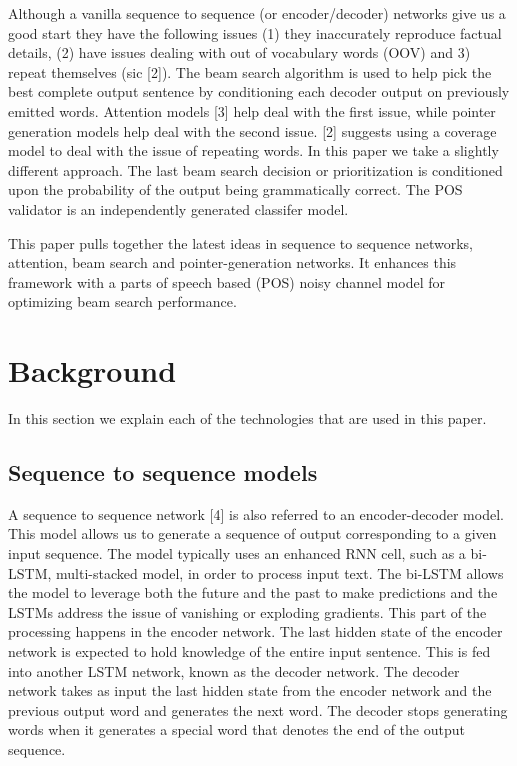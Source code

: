 \documentclass[11pt]{article}
\begin{document}
Although a vanilla sequence to sequence (or encoder/decoder) networks
give us a good start they have the following issues (1) they
inaccurately reproduce factual details, (2) have issues dealing with out
of vocabulary words (OOV) and 3) repeat themselves (sic {[}2{]}). The
beam search algorithm is used to help pick the best complete output
sentence by conditioning each decoder output on previously emitted
words. Attention models {[}3{]} help deal with the first issue, while
pointer generation models help deal with the second issue. {[}2{]}
suggests using a coverage model to deal with the issue of repeating
words. In this paper we take a slightly different approach. The last
beam search decision or prioritization is conditioned upon the
probability of the output being grammatically correct. The POS validator
is an independently generated classifer model.

This paper pulls together the latest ideas in sequence to sequence
networks, attention, beam search and pointer-generation networks. It
enhances this framework with a parts of speech based (POS) noisy channel
model for optimizing beam search performance.

    \section{Background}\label{background}

In this section we explain each of the technologies that are used in
this paper.

\subsection{Sequence to sequence
models}\label{sequence-to-sequence-models}

A sequence to sequence network {[}4{]} is also referred to an
encoder-decoder model. This model allows us to generate a sequence of
output corresponding to a given input sequence. The model typically uses
an enhanced RNN cell, such as a bi-LSTM, multi-stacked model, in order
to process input text. The bi-LSTM allows the model to leverage both the
future and the past to make predictions and the LSTMs address the issue
of vanishing or exploding gradients. This part of the processing happens
in the encoder network. The last hidden state of the encoder network is
expected to hold knowledge of the entire input sentence. This is fed
into another LSTM network, known as the decoder network. The decoder
network takes as input the last hidden state from the encoder network
and the previous output word and generates the next word. The decoder
stops generating words when it generates a special word that denotes the
end of the output sequence.
\end{document}
